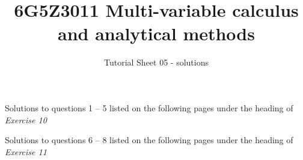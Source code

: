 \documentclass[a4paper]{amsart}
\begin{document}
\title{6G5Z3011 Multi-variable calculus and analytical methods}
\author{Tutorial Sheet 05 - solutions}
\maketitle

Solutions to questions 1 -- 5 listed on the following pages under the heading of \textit{Exercise 10}

Solutions to questions 6 -- 8 listed on the following pages under the heading of \textit{Exercise 11}



\end{document}
